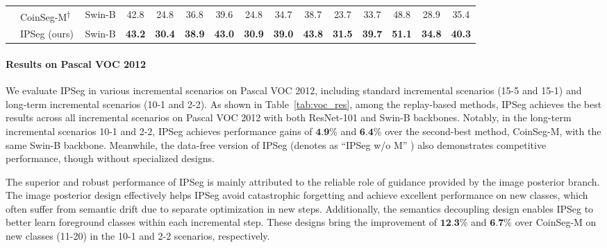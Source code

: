 \begin{table*}[t]
{\begin{tabular}{c|l|c||ccc|ccc|ccc|ccc}
    & CoinSeg-M\textsuperscript{†}~\citep{coinseg_zhang2023coinseg} & Swin-B & 42.8 & 24.8 & 36.8 & 39.6 & 24.8 & 34.7 & 38.7 & 23.7 & 33.7 & 48.8 & 28.9 & 35.4\\
    & IPSeg (ours) & Swin-B & \textbf{43.2} & \textbf{30.4} & \textbf{38.9} & \textbf{43.0} & \textbf{30.9} & \textbf{39.0} & \textbf{43.8} & \textbf{31.5} & \textbf{39.7} & \textbf{51.1} & \textbf{34.8} & \textbf{40.3}\\
    \bottomrule
    \end{tabular}
    }
    \label{tab:ade_res}
\end{table*}

\paragraph{Results on Pascal VOC 2012} 
We evaluate IPSeg in various incremental scenarios on Pascal VOC 2012, including standard incremental scenarios (15-5 and 15-1) and long-term incremental scenarios (10-1 and 2-2). As shown in Table~\ref{tab:voc_res}, among the replay-based methods, IPSeg achieves the best results across all incremental scenarios on Pascal VOC 2012 with both ResNet-101 and Swin-B backbones. Notably, in the long-term incremental scenarios 10-1 and 2-2, IPSeg achieves performance gains of $\textbf{4.9}$\% and $\textbf{6.4}$\% over the second-best method, CoinSeg-M, with the same Swin-B backbone.
Meanwhile, the data-free version of IPSeg (denotes as ``IPSeg w/o M'' ) also demonstrates competitive performance, though without specialized designs.

The superior and robust performance of IPSeg is mainly attributed to the reliable role of guidance provided by the image posterior branch.
The image posterior design effectively helps IPSeg avoid catastrophic forgetting and achieve excellent performance on new classes, which often suffer from semantic drift due to separate optimization in new steps.
Additionally, the semantics decoupling design enables IPSeg to better learn foreground classes within each incremental step. These designs bring the improvement of $\textbf{12.3}$\% and $\textbf{6.7}$\% over CoinSeg-M on new classes (11-20) in the 10-1 and 2-2 scenarios, respectively.



